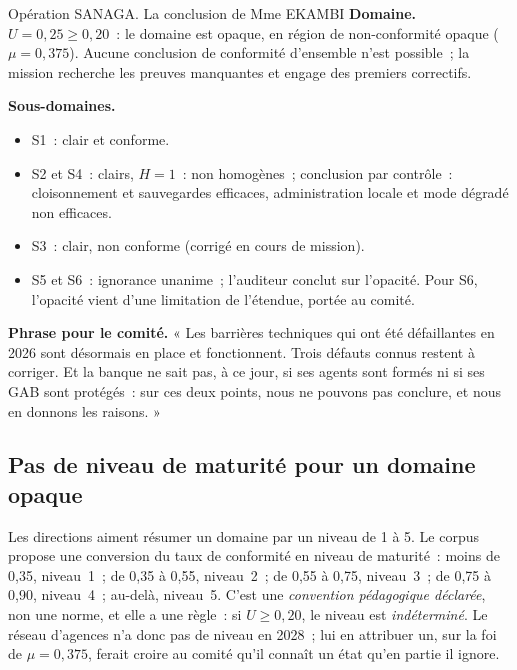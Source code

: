 \begin{boxscenario}{Opération SANAGA. La conclusion de Mme EKAMBI}
\textbf{Domaine.} $U = 0{,}25 \geq 0{,}20$~: le domaine est opaque, en
région de non-conformité opaque ($\mu = 0{,}375$). Aucune conclusion de
conformité d'ensemble n'est possible~; la mission recherche les preuves
manquantes et engage des premiers correctifs.

\medskip
\textbf{Sous-domaines.}
\begin{itemize}
    \item S1~: clair et conforme.
    \item S2 et S4~: clairs, $H = 1$~: non homogènes~; conclusion par
          contrôle~: cloisonnement et sauvegardes efficaces, administration
          locale et mode dégradé non efficaces.
    \item S3~: clair, non conforme (corrigé en cours de mission).
    \item S5 et S6~: ignorance unanime~; l'auditeur conclut sur l'opacité.
          Pour S6, l'opacité vient d'une limitation de l'étendue, portée au
          comité.
\end{itemize}

\textbf{Phrase pour le comité.} « Les barrières techniques qui ont été
défaillantes en 2026 sont désormais en place et fonctionnent. Trois
défauts connus restent à corriger. Et la banque ne sait pas, à ce jour, si
ses agents sont formés ni si ses GAB sont protégés~: sur ces deux points,
nous ne pouvons pas conclure, et nous en donnons les raisons. »
\end{boxscenario}

\subsection{Pas de niveau de maturité pour un domaine opaque}

Les directions aiment résumer un domaine par un niveau de 1 à 5. Le corpus
propose une conversion du taux de conformité en niveau de maturité~:
moins de 0,35, niveau~1~; de 0,35 à 0,55, niveau~2~; de 0,55 à 0,75,
niveau~3~; de 0,75 à 0,90, niveau~4~; au-delà, niveau~5. C'est une
\emph{convention pédagogique déclarée}, non une norme, et elle a une règle~:
si $U \geq 0{,}20$, le niveau est \emph{indéterminé}. Le réseau d'agences
n'a donc pas de niveau en 2028~; lui en attribuer un, sur la foi de
$\mu = 0{,}375$, ferait croire au comité qu'il connaît un état qu'en partie
il ignore.

